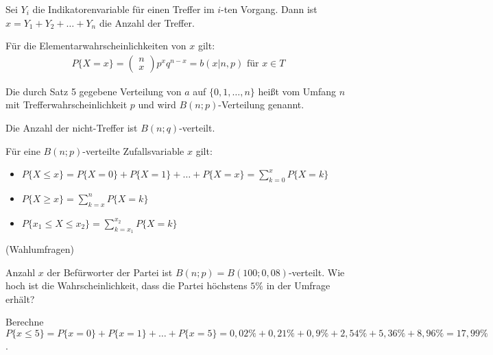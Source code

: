 Sei $Y_i$ die Indikatorenvariable für einen Treffer im $i$-ten Vorgang. Dann ist $x = Y_1 + Y_2 + \dots + Y_n$ die Anzahl der Treffer.

Für die Elementarwahrscheinlichkeiten von $x$ gilt:
\begin{align*}
    P\{X = x\} = \begin{pmatrix}n\\x\end{pmatrix}p^xq^{n-x} = b(x|n,p)\text{ für }x\in T
\end{align*}

Die durch Satz 5 gegebene Verteilung von $a$ auf $\{0,1,\dots,n\}$ heißt  vom Umfang $n$ mit Trefferwahrscheinlichkeit $p$ und wird $B(n;p)$-Verteilung genannt.

Die Anzahl der nicht-Treffer ist $B(n;q)$-verteilt.

Für eine $B(n;p)$-verteilte Zufallsvariable $x$ gilt:
\begin{itemize}
    \item{$P\{X \leq x\} = P\{X = 0\} + P\{X = 1\} + \dots + P\{X = x\} = \sum_{k = 0}^x P\{X = k\}$}
    \item{$P\{X \geq x\} = \sum_{k = x}^{n} P\{X = k\}$}
    \item{$P\{x_1 \leq X \leq x_2\} = \sum_{k = x_1}^{x_2} P\{X = k\}$}
\end{itemize}

 (Wahlumfragen)

Anzahl $x$ der Befürworter der Partei ist $B(n;p) = B(100;0,08)$-verteilt. Wie hoch ist die Wahrscheinlichkeit, dass die Partei höchstens $5\%{}$ in der Umfrage erhält?

Berechne $P\{x \leq 5\} = P\{x = 0\} + P\{x = 1\} + \dots + P\{x = 5\} = 0,02\%{} + 0,21\%{} + 0,9\%{} + 2,54\%{} + 5,36\%{} + 8,96\%{} = 17,99\%{}$.
